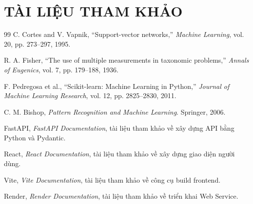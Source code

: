 \documentclass{article}
\begin{document}
	\section{\centering TÀI LIỆU THAM KHẢO}
	\begin{thebibliography}{99}
		C. Cortes and V. Vapnik, ``Support-vector networks,'' \textit{Machine Learning}, vol. 20, pp. 273--297, 1995.
		
		R. A. Fisher, ``The use of multiple measurements in taxonomic problems,'' \textit{Annals of Eugenics}, vol. 7, pp. 179--188, 1936.
		
		F. Pedregosa et al., ``Scikit-learn: Machine Learning in Python,'' \textit{Journal of Machine Learning Research}, vol. 12, pp. 2825--2830, 2011.
		
		C. M. Bishop, \textit{Pattern Recognition and Machine Learning}. Springer, 2006.
		
		FastAPI, \textit{FastAPI Documentation}, tài liệu tham khảo về xây dựng API bằng Python và Pydantic.
		
		React, \textit{React Documentation}, tài liệu tham khảo về xây dựng giao diện người dùng.
		
		Vite, \textit{Vite Documentation}, tài liệu tham khảo về công cụ build frontend.
		
		Render, \textit{Render Documentation}, tài liệu tham khảo về triển khai Web Service.
		
	\end{thebibliography}
	
	
	
	
	
	
	
	
	
	
	
	
	
	
	
	
	
	
	
	
	
	
	
	
	
	
	
	
	
	
	
	
	
	
	
	
	
	
	
	
	
	
	
	
	
	
	
	
	
	
	
	
\end{document}
